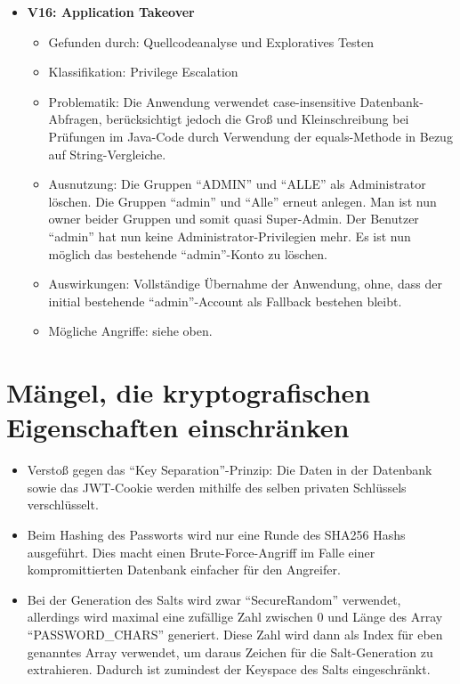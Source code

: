 \documentclass[12pt,DIV14,BCOR10mm,a4paper,parskip=half-,headsepline,headinclude,english,ngerman,bibliography=totocnumbered]{scrreprt}
\begin{document}
\begin{itemize}
  \hypertarget{vulnerability16}{}
  \item \textbf{V16: Application Takeover}
  \begin{itemize}
  \item Gefunden durch: Quellcodeanalyse und Exploratives Testen
  \item Klassifikation: Privilege Escalation
  \item Problematik: Die Anwendung verwendet case-insensitive Datenbank-Abfragen, berücksichtigt jedoch die Groß und Kleinschreibung bei Prüfungen im Java-Code durch Verwendung der equals-Methode in Bezug auf String-Vergleiche.
  \item Ausnutzung: Die Gruppen \enquote{ADMIN} und \enquote{ALLE} als Administrator löschen. Die Gruppen \enquote{admin} und \enquote{Alle} erneut anlegen. Man ist nun owner beider Gruppen und somit quasi Super-Admin. Der Benutzer \enquote{admin} hat nun keine Administrator-Privilegien mehr. Es ist nun möglich das bestehende \enquote{admin}-Konto zu löschen.
  \item Auswirkungen: Vollständige Übernahme der Anwendung, ohne, dass der initial bestehende \enquote{admin}-Account als Fallback bestehen bleibt.
  \item Mögliche Angriffe: siehe oben.
  \end{itemize}
\end{itemize}

\section{Mängel, die kryptografischen Eigenschaften einschränken}

\begin{itemize}
  \item Verstoß gegen das \enquote{Key Separation}-Prinzip: Die Daten in der Datenbank sowie das JWT-Cookie werden mithilfe des selben privaten Schlüssels verschlüsselt.
  \item Beim Hashing des Passworts wird nur eine Runde des SHA256 Hashs ausgeführt. Dies macht einen Brute-Force-Angriff im Falle einer kompromittierten Datenbank einfacher für den Angreifer.
  \item Bei der Generation des Salts wird zwar \enquote{SecureRandom} verwendet, allerdings wird maximal eine zufällige Zahl zwischen 0 und Länge des Array \enquote{PASSWORD\_CHARS} generiert. Diese Zahl wird dann als Index für eben genanntes Array verwendet, um daraus Zeichen für die Salt-Generation zu extrahieren. Dadurch ist zumindest der Keyspace des Salts eingeschränkt.
\end{itemize}
\end{document}
